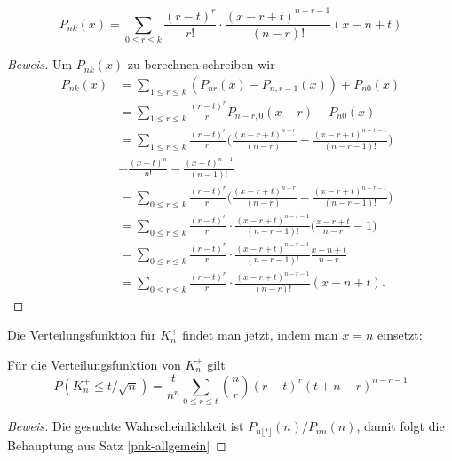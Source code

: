 \begin{satz}\label{pnk-allgemein}
\begin{equation}
P_{nk}(x)
=
\sum_{0\le r\le k}\frac{(r-t)^r}{r!}
\cdot
\frac{(x-r+t)^{n-r-1}}{(n-r)!}
(x-n+t)
\end{equation}
\end{satz}
\begin{proof}[Beweis]
Um $P_{nk}(x)$ zu berechnen schreiben wir
\begin{align*}
P_{nk}(x)
&=
\sum_{1\le r\le k}(P_{nr}(x)-P_{n,r-1}(x))+P_{n0}(x)
\\
&=
\sum_{1\le r\le k}\frac{(r-t)^r}{r!}P_{n-r,0}(x-r)+P_{n0}(x)
\\
&=
\sum_{1\le r\le k}\frac{(r-t)^r}{r!}\biggl(
\frac{(x-r+t)^{n-r}}{(n-r)!}-
\frac{(x-r+t)^{n-r-1}}{(n-r-1)!}\biggr)
\\
&
+\frac{(x+t)^{n}}{n!}- \frac{(x+t)^{n-1}}{(n-1)!}
\\
&=
\sum_{0\le r\le k}\frac{(r-t)^r}{r!}\biggl(
\frac{(x-r+t)^{n-r}}{(n-r)!}-
\frac{(x-r+t)^{n-r-1}}{(n-r-1)!}\biggr)
\\
&=
\sum_{0\le r\le k}\frac{(r-t)^r}{r!}
\cdot
\frac{(x-r+t)^{n-r-1}}{(n-r-1)!}
\biggl( \frac{x-r+t}{n-r}-1 \biggr)
\\
&=
\sum_{0\le r\le k}\frac{(r-t)^r}{r!}
\cdot
\frac{(x-r+t)^{n-r-1}}{(n-r-1)!}
\frac{x-n+t}{n-r}
\\
&=
\sum_{0\le r\le k}\frac{(r-t)^r}{r!}
\cdot
\frac{(x-r+t)^{n-r-1}}{(n-r)!}
(x-n+t).
\end{align*}
\end{proof}
Die Verteilungsfunktion für $K_n^+$ findet man jetzt, indem man $x=n$
einsetzt:

\begin{satz}\label{kn-verteilung}
Für die Verteilungsfunktion von $K_n^+$ gilt
\begin{equation}
P(K_n^+\le t/\sqrt{n})=\frac{t}{n^n}\sum_{0\le r\le t}\binom{n}{r}(r-t)^r(t+n-r)^{n-r-1}
\end{equation}
\end{satz}
\begin{proof}[Beweis]
Die gesuchte Wahrscheinlichkeit ist $P_{n\lfloor t\rfloor}(n)/P_{nn}(n)$,
damit folgt die Behauptung aus Satz \ref{pnk-allgemein}
\end{proof}


